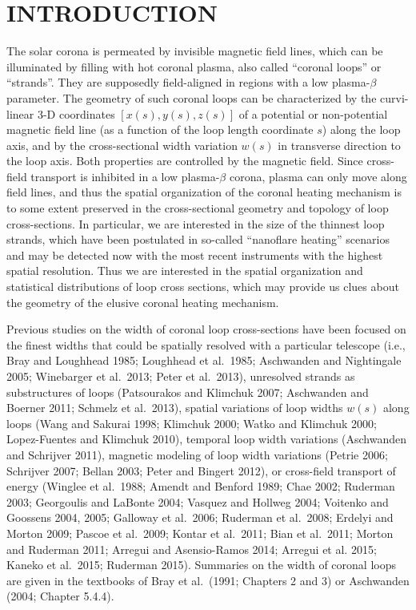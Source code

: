 \documentclass[10pt,preprint]{aastex}  %
\begin{document}
\section{		    INTRODUCTION			}

The solar corona is permeated by invisible magnetic field lines,
which can be illuminated by filling with hot coronal plasma, 
also called ``coronal loops'' or ``strands''. They are supposedly field-aligned 
in regions with a low plasma-$\beta$ parameter. The geometry of 
such coronal loops can be characterized by the curvi-linear 3-D coordinates 
$[x(s), y(s), z(s)]$ of a potential or non-potential magnetic field line
(as a function of the loop length coordinate $s$) along the loop axis,
and by the cross-sectional width variation $w(s)$ in transverse direction
to the loop axis. Both properties are controlled by the magnetic field.
Since cross-field transport is inhibited in a low plasma-$\beta$ corona,
plasma can only move along field lines, and thus the spatial organization
of the coronal heating mechanism is to some extent preserved in the
cross-sectional geometry and topology of loop cross-sections. In particular,
we are interested in the size of the thinnest loop strands, which have been
postulated in so-called ``nanoflare heating'' scenarios and may be
detected now with the most recent instruments with the highest spatial 
resolution. Thus we are interested in the spatial organization and statistical 
distributions of loop cross sections, which may provide us clues 
about the geometry of the elusive coronal heating mechanism.  

Previous studies on the width of coronal loop cross-sections have
been focused on the finest widths that could be spatially resolved with a 
particular telescope (i.e., Bray and Loughhead 1985; Loughhead et al.~1985; 
Aschwanden and Nightingale 2005; Winebarger et al.~2013; Peter et al.~2013),
unresolved strands as substructures of loops (Patsourakos and Klimchuk 2007;
Aschwanden and Boerner 2011; Schmelz et al.~2013),
spatial variations of loop widths $w(s)$ along loops (Wang and Sakurai 1998;
Klimchuk 2000; Watko and Klimchuk 2000; 
Lopez-Fuentes and Klimchuk 2010),
temporal loop width variations (Aschwanden and Schrijver 2011),
magnetic modeling of loop width variations (Petrie 2006; Schrijver 2007;
Bellan 2003; Peter and Bingert 2012),
or cross-field transport of energy (Winglee et al.~1988; 
Amendt and Benford 1989; Chae 2002; Ruderman 2003;
Georgoulis and LaBonte 2004; Vasquez and Hollweg 2004;
Voitenko and Goossens 2004, 2005; Galloway et al.~2006; 
Ruderman et al.~2008; Erdelyi and Morton 2009; Pascoe et al.~2009;
Kontar et al.~2011; Bian et al.~2011; Morton and Ruderman 2011;
Arregui and Asensio-Ramos 2014; Arregui et al. 2015;
Kaneko et al.~2015; Ruderman 2015). Summaries 
on the width of coronal loops are given in the textbooks of
Bray et al.~(1991; Chapters 2 and 3) or 
Aschwanden (2004; Chapter 5.4.4).
\end{document}
